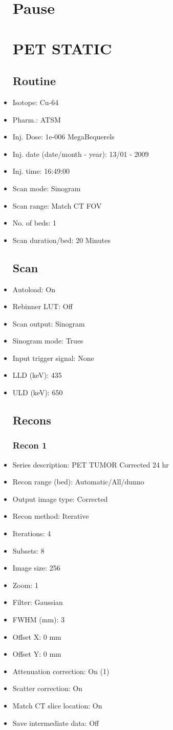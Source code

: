 \documentclass[12pt]{article}
\begin{document}
\begin{itemize}
\section{Pause}
\section{PET STATIC }\subsection{Routine}
\item Isotope: Cu-64
\item Pharm.: ATSM
\item Inj. Dose: 1e-006 MegaBequerels
\item Inj. date (date/month - year): 13/01 - 2009
\item Inj. time: 16:49:00
\item Scan mode: Sinogram
\item Scan range: Match CT FOV
\item No. of beds: 1
\item Scan duration/bed: 20 Minutes
\subsection{Scan}
\item Autoload: On
\item Rebinner LUT: Off
\item Scan output: Sinogram
\item Sinogram mode: Trues
\item Input trigger signal: None
\item LLD (keV): 435
\item ULD (keV): 650
\subsection{Recons}
\subsubsection{Recon 1}
\item Series description: PET TUMOR Corrected 24 hr
\item Recon range (bed): Automatic/All/dunno
\item Output image type: Corrected
\item Recon method: Iterative
\item Iterations: 4
\item Subsets: 8
\item Image size: 256
\item Zoom: 1
\item Filter: Gaussian
\item FWHM (mm): 3
\item Offset X: 0 mm
\item Offset Y: 0 mm
\item Attenuation correction: On (1)
\item Scatter correction: On
\item Match CT slice location: On
\item Save intermediate data: Off

\end{itemize}
\end{document}
